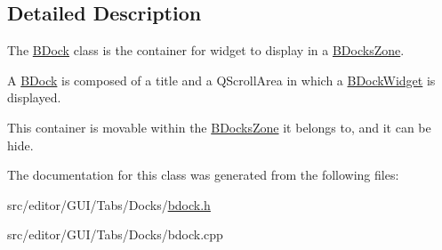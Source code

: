 \subsection{\-Detailed \-Description}
\-The \hyperlink{class_b_dock}{\-B\-Dock} class is the container for widget to display in a \hyperlink{class_b_docks_zone}{\-B\-Docks\-Zone}. 

\-A \hyperlink{class_b_dock}{\-B\-Dock} is composed of a title and a \-Q\-Scroll\-Area in which a \hyperlink{class_b_dock_widget}{\-B\-Dock\-Widget} is displayed.

\-This container is movable within the \hyperlink{class_b_docks_zone}{\-B\-Docks\-Zone} it belongs to, and it can be hide. 

\-The documentation for this class was generated from the following files\-:\begin{DoxyCompactItemize}
\item 
src/editor/\-G\-U\-I/\-Tabs/\-Docks/\hyperlink{bdock_8h}{bdock.\-h}\item 
src/editor/\-G\-U\-I/\-Tabs/\-Docks/bdock.\-cpp\end{DoxyCompactItemize}
